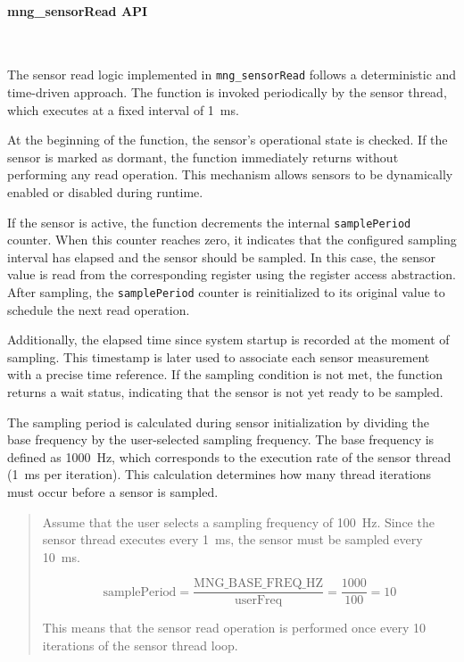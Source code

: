 \paragraph{mng\_sensorRead API}\

The sensor read logic implemented in \texttt{mng\_sensorRead} follows a deterministic 
and time-driven approach. The function is invoked periodically by the sensor thread, 
which executes at a fixed interval of 1~ms.

At the beginning of the function, the sensor’s operational state is checked. If the 
sensor is marked as dormant, the function immediately returns without performing any 
read operation. This mechanism allows sensors to be dynamically enabled or disabled 
during runtime.

If the sensor is active, the function decrements the internal \texttt{samplePeriod} 
counter. When this counter reaches zero, it indicates that the configured sampling 
interval has elapsed and the sensor should be sampled. In this case, the sensor value 
is read from the corresponding register using the register access abstraction. After 
sampling, the \texttt{samplePeriod} counter is reinitialized to its original value to 
schedule the next read operation.

Additionally, the elapsed time since system startup is recorded at the moment of 
sampling. This timestamp is later used to associate each sensor measurement with a 
precise time reference. If the sampling condition is not met, the function returns a 
wait status, indicating that the sensor is not yet ready to be sampled.

The sampling period is calculated during sensor initialization by dividing the base frequency by the user-selected sampling frequency. The base frequency is defined as 1000~Hz, which corresponds to the execution rate of the sensor thread (1~ms per iteration). This calculation determines how many thread iterations must occur before a sensor is sampled.

\begin{quote}
Assume that the user selects a sampling frequency of 100~Hz.  
Since the sensor thread executes every 1~ms, the sensor must be sampled every 10~ms.

\[
\text{samplePeriod} = \frac{\text{MNG\_BASE\_FREQ\_HZ}}{\text{userFreq}} =
\frac{1000}{100} = 10
\]

This means that the sensor read operation is performed once every 10 iterations of the sensor thread loop.
\end{quote}


